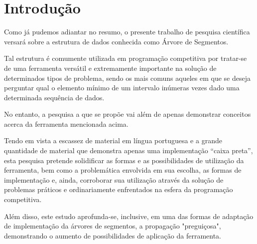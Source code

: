 \chapter{Introdução}
\label{cap:introducao}

Como já pudemos adiantar no resumo, o presente trabalho de pesquisa científica 
versará sobre a estrutura de dados conhecida como Árvore de Segmentos.

Tal estrutura é comumente utilizada em programação competitiva por tratar-se de 
uma ferramenta versátil e extremamente importante na solução de determinados 
tipos de problema, sendo os mais comuns aqueles em que se deseja perguntar qual o 
elemento mínimo de um intervalo inúmeras vezes dado uma determinada sequência de dados.

No entanto, a pesquisa a que se propõe vai além de apenas demonstrar conceitos 
acerca da ferramenta mencionada acima.

Tendo em vista a escassez de material em língua portuguesa e a grande quantidade 
de material que demonstra apenas uma implementação “caixa preta”, esta pesquisa 
pretende solidificar as formas e as possibilidades de utilização da ferramenta, bem como 
a problemática envolvida em sua escolha, as formas de implementação e, ainda, 
corroborar sua utilização através da solução de problemas práticos e 
ordinariamente enfrentados na esfera da programação competitiva.

Além disso, este estudo aprofunda-se, inclusive, em uma das formas de adaptação 
de implementação da árvores de segmentos, a propagação "preguiçosa", demonstrando o 
aumento de possibilidades de aplicação da ferramenta.


